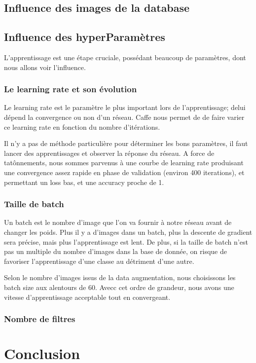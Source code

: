 \documentclass[a4paper,12pt]{article}
\begin{document}
  \subsection{Influence des images de la database}

  
  \subsection{Influence des hyperParamètres}
    L'apprentissage est une étape cruciale, possédant beaucoup de paramètres, dont nous allons voir l'influence.
    \subsubsection{Le learning rate et son évolution}
      Le learning rate est le paramètre le plus important lors de l'apprentissage; delui dépend la convergence ou non d'un réseau. Caffe nous permet de de faire varier ce learning rate en fonction du nombre d'itérations.

      Il n'y a pas de méthode particulière pour déterminer les bons paramètres, il faut lancer des apprentissages et observer la réponse du réseau. A force de tatônnements, nous sommes parvenus à une courbe de learning rate produisant une convergence assez rapide en phase de validation (environ 400 iterations), et permettant un loss bas, et une accuracy proche de 1.

    \subsubsection{Taille de batch}
      Un batch est le nombre d'image que l'on va fournir à notre réseau avant de changer les poids. Plus il y a d'images dans un batch, plus la descente de gradient sera précise, mais plus l'apprentissage est lent. De plus, si la taille de batch n'est pas un multiple du nombre d'images dans la base de donnée, on risque de favoriser l'apprentissage d'une classe au détriment d'une autre. 

      Selon le nombre d'images issus de la data augmentation, nous choisissons les batch size aux alentours de 60. Avecc cet ordre de grandeur, nous avons une vitesse d'apprentissage acceptable tout en convergeant.
    \subsubsection{Nombre de filtres}
      

\newpage
\section*{Conclusion}
  
\end{document}
